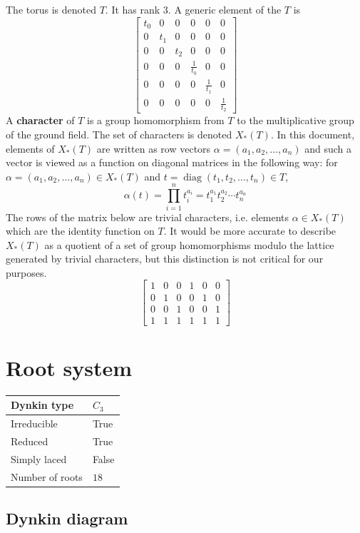 \documentclass[11pt]{article}
\newcommand{\tbf}{\textbf}
\DeclareMathOperator{\diag}{diag}
\theoremstyle{definition}
\begin{document}
The torus is denoted $T$. It has rank $3$. A generic element of the $T$ is
\[
\left[\begin{matrix}t_{0} & 0 & 0 & 0 & 0 & 0\\0 & t_{1} & 0 & 0 & 0 & 0\\0 & 0 & t_{2} & 0 & 0 & 0\\0 & 0 & 0 & \frac{1}{t_{0}} & 0 & 0\\0 & 0 & 0 & 0 & \frac{1}{t_{1}} & 0\\0 & 0 & 0 & 0 & 0 & \frac{1}{t_{2}}\end{matrix}\right]
\]
A \tbf{character} of $T$ is a group homomorphism from $T$ to the multiplicative group of the ground field. The set of characters is denoted $X_*(T)$. In this document, elements of $X_*(T)$ are written as row vectors $\alpha = (a_1, a_2, \ldots, a_n)$ and such a vector is viewed as a function on diagonal matrices in the following way: for $\alpha = (a_1, a_2, \ldots, a_n) \in X_*(T)$ and $t = \diag(t_1, t_2, \ldots, t_n) \in T$, 
\[
	\alpha(t) = \prod_{i=1}^n t_i^{a_i} = t_1^{a_1} t_2^{a_2} \cdots t_n^{a_n}
\]
The rows of the matrix below are trivial characters, i.e. elements $\alpha \in X_*(T)$ which are the identity function on $T$. It would be more accurate to describe $X_*(T)$ as a quotient of a set of group homomorphisms modulo the lattice generated by trivial characters, but this distinction is not critical for our purposes.
\[
\left[\begin{matrix}1 & 0 & 0 & 1 & 0 & 0\\0 & 1 & 0 & 0 & 1 & 0\\0 & 0 & 1 & 0 & 0 & 1\\1 & 1 & 1 & 1 & 1 & 1\end{matrix}\right]
\]

\newpage
\section{Root system}

\begin{tabular}{|l|l|}
	\hline
    Dynkin type & $C_3$ \\
	\hline
    Irreducible & True \\
	\hline
    Reduced & True \\
	\hline
	Simply laced & False \\
	\hline
	Number of roots & $18$ \\
	\hline
\end{tabular}

\subsection{Dynkin diagram}
\end{document}
